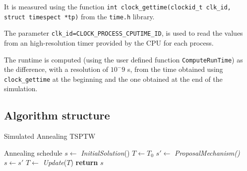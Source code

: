 \begin{homeworkProblem}
It is measured using the function \verb|int clock_gettime(clockid_t clk_id, struct timespect *tp)| from the \verb|time.h| library.

The parameter \verb|clk_id=CLOCK_PROCESS_CPUTIME_ID|, is used to read the values from an high-resolution timer provided by the CPU for each process.

The runtime is computed (using the user defined function \verb|ComputeRunTime|) as the difference, with a resolution of $10^-9$ s, from the time obtained using \verb|clock_gettime| at the beginning and the one obtained at the end of the simulation.

\subsection{Algorithm structure} \label{sec:algstrucSA}
\begin{algorithm}
\caption{Simulated Annealing TSPTW}
\label{SA:TSPTW}
\begin{algorithmic}
  \Require Annealing schedule
  \State $s \gets$ \emph{InitialSolution}() 
  \State $T \gets T_0$ 
    \State $s' \gets$ \emph{ProposalMechanism()} 
     
      \State $s \gets s'$
    \EndIf
  \State $T \gets$ \emph{Update}($T$) 
\EndWhile
  \State \textbf{return} $s$
\EndProcedure
\end{algorithmic}
\end{algorithm}

\begin{center}
  
\begin{minipage}{.45\textwidth}
\centering
{}
\end{minipage}%
\hspace{1.5cm}
\begin{minipage}{.45\textwidth}
\centering

\end{minipage}
\end{center}
\end{homeworkProblem}
